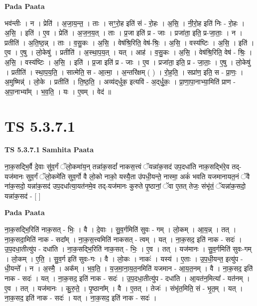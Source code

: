 \documentclass[17pt]{extarticle}
\begin{document}
\textbf{Pada Paata} \newline

भव॑न्तीः । न । प्रेति॑ । अ॒जा॒य॒न्त॒ । ताः । सꣳ॒॒रो॒ह इति॑ सं - रो॒हः । अ॒सि॒ । नी॒रो॒ह इति॑ निः - रो॒हः । अ॒सि॒ । इति॑ । ए॒व । प्रेति॑ । अ॒ज॒न॒य॒त् । ताः । प्र॒जा इति॑ प्र - जाः । प्रजा॑ता॒ इति॒ प्र-जा॒ताः॒ । न । प्रतीति॑ । अ॒ति॒ष्ठ॒न्न् । ताः । व॒सु॒कः । अ॒सि॒ । वेष॑श्रि॒रिति॒ वेष॑-श्रिः॒ । अ॒सि॒ । वस्य॑ष्टिः । अ॒सि॒ । इति॑ । ए॒व । ए॒षु । लो॒केषु॑ । प्रतीति॑ । अ॒स्था॒प॒य॒त् । यत् । आह॑ । व॒सु॒कः । अ॒सि॒ । वेष॑श्रि॒रिति॒ वेष॑ - श्रिः॒ । अ॒सि॒ । वस्य॑ष्टिः । अ॒सि॒ । इति॑ । प्र॒जा इति॑ प्र - जाः । ए॒व । प्रजा॑ता॒ इति॒ प्र - जा॒ताः॒ । ए॒षु । लो॒केषु॑ । प्रतीति॑ । स्था॒प॒य॒ति॒ । सात्मेति॒ स - आ॒त्मा॒ । अ॒न्तरि॑क्षम् ( ) । रो॒ह॒ति॒ । सप्रा॑ण॒ इति॒ स - प्रा॒णः॒ । अ॒मुष्मिन्न्॑ । लो॒के । प्रतीति॑ । ति॒ष्ठ॒ति॒ । अव्य॑द्‌र्धुक॒ इत्यवि॑ - अ॒द्‌र्धु॒कः॒ । प्रा॒णा॒पा॒नाभ्या॒मिति॑ प्राण - अ॒पा॒नाभ्या᳚म् । भ॒व॒ति॒ । यः । ए॒वम् । वेद॑ ॥  \newline




\section*{ TS 5.3.7.1 }

\textbf{TS 5.3.7.1 } \newline
\textbf{Samhita Paata} \newline

ना॒क॒सद्भि॒र्वै दे॒वाः सु॑व॒र्गं ॅलो॒कमा॑य॒न् तन्ना॑क॒सदां᳚ नाकस॒त्त्वं ॅयन्ना॑क॒सद॑ उप॒दधा॑ति नाक॒सद्भि॑रे॒व तद्-यज॑मानः सुव॒र्गं ॅलो॒कमे॑ति सुव॒र्गो वै लो॒को नाको॒ यस्यै॒ता उ॑पधी॒यन्ते॒ नास्मा॒ अकं॑ भवति यजमानायत॒नं ॅवै ना॑क॒सदो॒ यन्ना॑क॒सद॑ उप॒दधा᳚त्या॒यत॑नमे॒व तद्-यज॑मानः कुरुते पृ॒ष्ठानां॒ ॅवा ए॒तत् तेजः॒ संभृ॑तं॒ ॅयन्ना॑क॒सदो॒ यन्ना॑क॒सद॑ - [  ] \newline

\textbf{Pada Paata} \newline

ना॒क॒सद्भि॒रिति॑ नाक॒सत् - भिः॒ । वै । दे॒वाः । सु॒व॒र्गमिति॑ सुवः - गम् । लो॒कम् । आ॒य॒न्न् । तत् । ना॒क॒सदा॒मिति॑ नाक - सदा᳚म् । ना॒क॒स॒त्त्वमिति॑ नाकसत् - त्वम् । यत् । ना॒क॒सद॒ इति॑ नाक - सदः॑ । उ॒प॒दधा॒तीत्यु॑प - दधा॑ति । ना॒क॒सद्भि॒रिति॑ नाक॒सत् - भिः॒ । ए॒व । तत् । यज॑मानः । सु॒व॒र्गमिति॑ सुवः-गम् । लो॒कम् । ए॒ति॒ । सु॒व॒र्ग इति॑ सुवः-गः । वै । लो॒कः । नाकः॑ । यस्य॑ । ए॒ताः । उ॒प॒धी॒यन्त॒ इत्यु॑प - धी॒यन्ते᳚ । न । अ॒स्मै॒ । अक᳚म् । भ॒व॒ति॒ । य॒ज॒मा॒ना॒य॒त॒नमिति॑ यजमान - आ॒य॒त॒नम् । वै । ना॒क॒सद॒ इति॑ नाक - सदः॑ । यत् । ना॒क॒सद॒ इति॑ नाक - सदः॑ । उ॒प॒दधा॒तीत्यु॑प - दधा॑ति । आ॒यत॑न॒मित्या᳚ - यत॑नम् । ए॒व । तत् । यज॑मानः । कु॒रु॒ते॒ । पृ॒ष्ठाना᳚म् । वै । ए॒तत् । तेजः॑ । संभृ॑त॒मिति॒ सं - भृ॒त॒म् । यत् । ना॒क॒सद॒ इति॑ नाक - सदः॑ । यत् । ना॒क॒सद॒ इति॑ नाक - सदः॑ ।  \newline
\end{document}
